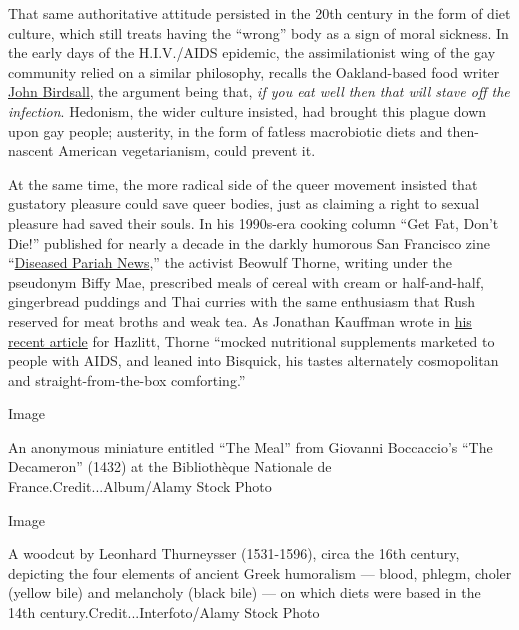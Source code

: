 That same authoritative attitude persisted in the 20th century in the
form of diet culture, which still treats having the ``wrong'' body as a
sign of moral sickness. In the early days of the H.I.V./AIDS epidemic,
the assimilationist wing of the gay community relied on a similar
philosophy, recalls the Oakland-based food writer
\href{https://www.john-birdsall.com/}{John Birdsall}, the argument being
that, \emph{if you eat well then that will stave off the infection}.
Hedonism, the wider culture insisted, had brought this plague down upon
gay people; austerity, in the form of fatless macrobiotic diets and
then-nascent American vegetarianism, could prevent it.

At the same time, the more radical side of the queer movement insisted
that gustatory pleasure could save queer bodies, just as claiming a
right to sexual pleasure had saved their souls. In his 1990s-era cooking
column ``Get Fat, Don't Die!'' published for nearly a decade in the
darkly humorous San Francisco zine
``\href{https://calisphere.org/collections/22661/?fbclid=IwAR2XcihgRMuSlZePJfzGuwyfZhaKWUutxnHqZQworbMUDdoOj0wpYYNf-5s}{Diseased
Pariah News},'' the activist Beowulf Thorne, writing under the pseudonym
Biffy Mae, prescribed meals of cereal with cream or half-and-half,
gingerbread puddings and Thai curries with the same enthusiasm that Rush
reserved for meat broths and weak tea. As Jonathan Kauffman wrote in
\href{https://hazlitt.net/longreads/get-fat-dont-die}{his recent
article} for Hazlitt, Thorne ``mocked nutritional supplements marketed
to people with AIDS, and leaned into Bisquick, his tastes alternately
cosmopolitan and straight-from-the-box comforting.''

Image

An anonymous miniature entitled ``The Meal'' from Giovanni Boccaccio's
``The Decameron'' (1432) at the Bibliothèque Nationale de
France.Credit...Album/Alamy Stock Photo

Image

A woodcut by Leonhard Thurneysser (1531-1596), circa the 16th century,
depicting the four elements of ancient Greek humoralism --- blood,
phlegm, choler (yellow bile) and melancholy (black bile) --- on which
diets were based in the 14th century.Credit...Interfoto/Alamy Stock
Photo

